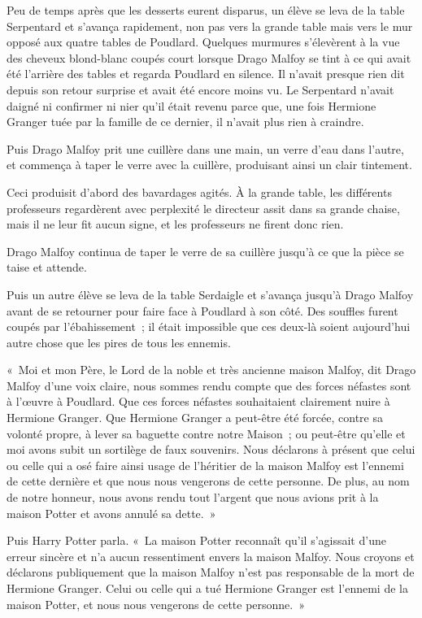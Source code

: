 Peu de temps après que les desserts eurent disparus, un élève se leva de la table Serpentard et s'avança rapidement, non pas vers la grande table mais vers le mur opposé aux quatre tables de Poudlard. Quelques murmures s'élevèrent à la vue des cheveux blond-blanc coupés court lorsque Drago Malfoy se tint à ce qui avait été l'arrière des tables et regarda Poudlard en silence. Il n'avait presque rien dit depuis son retour surprise et avait été encore moins vu. Le Serpentard n'avait daigné ni confirmer ni nier qu'il était revenu parce que, une fois Hermione Granger tuée par la famille de ce dernier, il n'avait plus rien à craindre.

Puis Drago Malfoy prit une cuillère dans une main, un verre d'eau dans l'autre, et commença à taper le verre avec la cuillère, produisant ainsi un clair tintement.

Ceci produisit d'abord des bavardages agités. À la grande table, les différents professeurs regardèrent avec perplexité le directeur assit dans sa grande chaise, mais il ne leur fit aucun signe, et les professeurs ne firent donc rien.

Drago Malfoy continua de taper le verre de sa cuillère jusqu'à ce que la pièce se taise et attende.

Puis un autre élève se leva de la table Serdaigle et s'avança jusqu'à Drago Malfoy avant de se retourner pour faire face à Poudlard à son côté. Des souffles furent coupés par l'ébahissement~; il était impossible que ces deux-là soient aujourd'hui autre chose que les pires de tous les ennemis.

«~Moi et mon Père, le Lord de la noble et très ancienne maison Malfoy, dit Drago Malfoy d'une voix claire, nous sommes rendu compte que des forces néfastes sont à l'œuvre à Poudlard. Que ces forces néfastes souhaitaient clairement nuire à Hermione Granger. Que Hermione Granger a peut-être été forcée, contre sa volonté propre, à lever sa baguette contre notre Maison~; ou peut-être qu'elle et moi avons subit un sortilège de faux souvenirs. Nous déclarons à présent que celui ou celle qui a osé faire ainsi usage de l'héritier de la maison Malfoy est l'ennemi de cette dernière et que nous nous vengerons de cette personne. De plus, au nom de notre honneur, nous avons rendu tout l'argent que nous avions prit à la maison Potter et avons annulé sa dette.~»

Puis Harry Potter parla. «~La maison Potter reconnaît qu'il s'agissait d'une erreur sincère et n'a aucun ressentiment envers la maison Malfoy. Nous croyons et déclarons publiquement que la maison Malfoy n'est pas responsable de la mort de Hermione Granger. Celui ou celle qui a tué Hermione Granger est l'ennemi de la maison Potter, et nous nous vengerons de cette personne.~»

